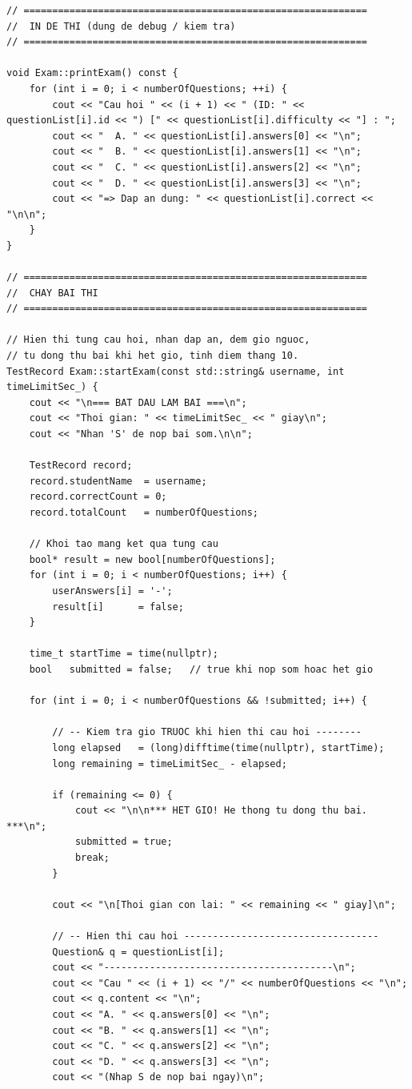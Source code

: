 \documentclass[11pt]{report}
\begin{document}
\begin{lstlisting}[caption={Exam.cpp -- Cài đặt logic sinh đề, xáo trộn, bộ đếm giờ}, label={lst:full_exam_cpp}]
// ============================================================
//  IN DE THI (dung de debug / kiem tra)
// ============================================================

void Exam::printExam() const {
    for (int i = 0; i < numberOfQuestions; ++i) {
        cout << "Cau hoi " << (i + 1) << " (ID: " << questionList[i].id << ") [" << questionList[i].difficulty << "] : ";
        cout << "  A. " << questionList[i].answers[0] << "\n";
        cout << "  B. " << questionList[i].answers[1] << "\n";
        cout << "  C. " << questionList[i].answers[2] << "\n";
        cout << "  D. " << questionList[i].answers[3] << "\n";
        cout << "=> Dap an dung: " << questionList[i].correct << "\n\n";
    }
}

// ============================================================
//  CHAY BAI THI
// ============================================================

// Hien thi tung cau hoi, nhan dap an, dem gio nguoc,
// tu dong thu bai khi het gio, tinh diem thang 10.
TestRecord Exam::startExam(const std::string& username, int timeLimitSec_) {
    cout << "\n=== BAT DAU LAM BAI ===\n";
    cout << "Thoi gian: " << timeLimitSec_ << " giay\n";
    cout << "Nhan 'S' de nop bai som.\n\n";

    TestRecord record;
    record.studentName  = username;
    record.correctCount = 0;
    record.totalCount   = numberOfQuestions;

    // Khoi tao mang ket qua tung cau
    bool* result = new bool[numberOfQuestions];
    for (int i = 0; i < numberOfQuestions; i++) {
        userAnswers[i] = '-';
        result[i]      = false;
    }

    time_t startTime = time(nullptr);
    bool   submitted = false;   // true khi nop som hoac het gio

    for (int i = 0; i < numberOfQuestions && !submitted; i++) {

        // -- Kiem tra gio TRUOC khi hien thi cau hoi --------
        long elapsed   = (long)difftime(time(nullptr), startTime);
        long remaining = timeLimitSec_ - elapsed;

        if (remaining <= 0) {
            cout << "\n\n*** HET GIO! He thong tu dong thu bai. ***\n";
            submitted = true;
            break;
        }

        cout << "\n[Thoi gian con lai: " << remaining << " giay]\n";

        // -- Hien thi cau hoi ----------------------------------
        Question& q = questionList[i];
        cout << "----------------------------------------\n";
        cout << "Cau " << (i + 1) << "/" << numberOfQuestions << "\n";
        cout << q.content << "\n";
        cout << "A. " << q.answers[0] << "\n";
        cout << "B. " << q.answers[1] << "\n";
        cout << "C. " << q.answers[2] << "\n";
        cout << "D. " << q.answers[3] << "\n";
        cout << "(Nhap S de nop bai ngay)\n";


\end{lstlisting}
\end{document}
